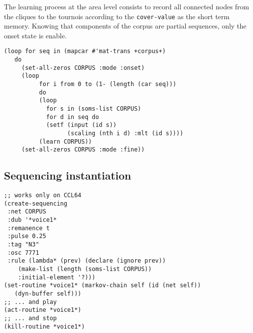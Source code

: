 The learning process at the area level consists to record all connected nodes from the cliques to the tournois according to the \texttt{cover-value} as the short term memory. Knowing that components of the corpus are partial sequences, only the onset state is enable.
\begin{lstlisting}[language=N3]
(loop for seq in (mapcar #'mat-trans +corpus+)
   do     
     (set-all-zeros CORPUS :mode :onset)  
     (loop
	      for i from 0 to (1- (length (car seq))) 
	      do
	      (loop
	        for s in (soms-list CORPUS)
	        for d in seq do
	        (setf (input (id s)) 
	              (scaling (nth i d) :mlt (id s))))
	      (learn CORPUS))
     (set-all-zeros CORPUS :mode :fine))
\end{lstlisting}

\subsection{Sequencing instantiation}

\begin{lstlisting}[language=N3]
;; works only on CCL64
(create-sequencing
 :net CORPUS
 :dub '*voice1*
 :remanence t
 :pulse 0.25
 :tag "N3"
 :osc 7771
 :rule (lambda* (prev) (declare (ignore prev)) 
    (make-list (length (soms-list CORPUS)) 
    :initial-element '?)))
(set-routine *voice1* (markov-chain self (id (net self)) 
   (dyn-buffer self)))
;; ... and play
(act-routine *voice1*)
;; ... and stop
(kill-routine *voice1*)
\end{lstlisting}
